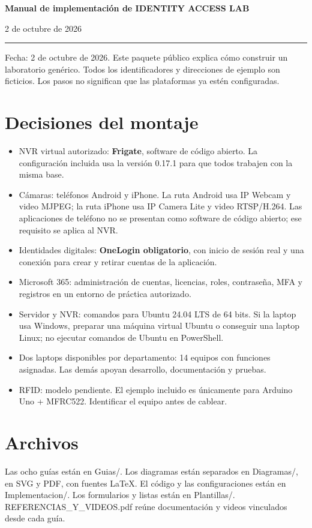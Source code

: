 \documentclass[12pt,a4paper]{article}
\begin{document}
{\LARGE\bfseries Manual de implementación de IDENTITY ACCESS LAB\par}\vspace{6pt}
2 de octubre de 2026\par\hrule\vspace{10pt}
Fecha: 2 de octubre de 2026. Este paquete público explica cómo construir un laboratorio genérico. Todos los identificadores y direcciones de ejemplo son ficticios. Los pasos no significan que las plataformas ya estén configuradas.\par
{}\section*{Decisiones del montaje}
\begin{itemize}
\item NVR virtual autorizado: \textbf{Frigate}, software de código abierto. La configuración incluida usa la versión 0.17.1 para que todos trabajen con la misma base.
\item Cámaras: teléfonos Android y iPhone. La ruta Android usa IP Webcam y video MJPEG; la ruta iPhone usa IP Camera Lite y video RTSP/H.264. Las aplicaciones de teléfono no se presentan como software de código abierto; ese requisito se aplica al NVR.
\item Identidades digitales: \textbf{OneLogin obligatorio}, con inicio de sesión real y una conexión para crear y retirar cuentas de la aplicación.
\item Microsoft 365: administración de cuentas, licencias, roles, contraseña, MFA y registros en un entorno de práctica autorizado.
\item Servidor y NVR: comandos para Ubuntu 24.04 LTS de 64 bits. Si la laptop usa Windows, preparar una máquina virtual Ubuntu o conseguir una laptop Linux; no ejecutar comandos de Ubuntu en PowerShell.
\item Dos laptops disponibles por departamento: 14 equipos con funciones asignadas. Las demás apoyan desarrollo, documentación y pruebas.
\item RFID: modelo pendiente. El ejemplo incluido es únicamente para Arduino Uno + MFRC522. Identificar el equipo antes de cablear.
\end{itemize}
\section*{Archivos}
Las ocho guías están en \textnormal{Guias/\allowbreak{}}. Los diagramas están separados en \textnormal{Diagramas/\allowbreak{}}, en SVG y PDF, con fuentes LaTeX. El código y las configuraciones están en \textnormal{Implementacion/\allowbreak{}}. Los formularios y listas están en \textnormal{Plantillas/\allowbreak{}}. \textnormal{REFERENCIAS\_\allowbreak{}Y\_\allowbreak{}VIDEOS.pdf} reúne documentación y videos vinculados desde cada guía.\par
\end{document}
